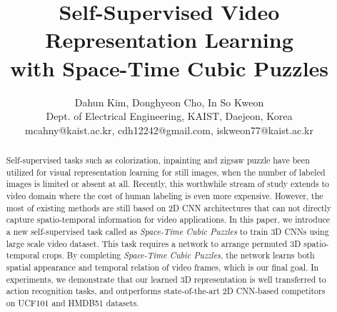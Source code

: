 \documentclass[letterpaper]{article} \usepackage{aaai19}  \usepackage{times}  \usepackage{helvet}  \usepackage{courier}  \usepackage{url}  \usepackage{graphicx}  \frenchspacing  \setlength{\pdfpagewidth}{8.5in}  \setlength{\pdfpageheight}{11in}
\begin{document}
\title{Self-Supervised Video Representation Learning \\with Space-Time Cubic Puzzles}
\author{Dahun Kim, Donghyeon Cho, In So Kweon\\
Dept. of Electrical Engineering, KAIST, Daejeon, Korea\\
mcahny@kaist.ac.kr, cdh12242@gmail.com, iskweon77@kaist.ac.kr
}

\maketitle

\begin{abstract}
Self-supervised tasks such as colorization, inpainting and zigsaw puzzle have been utilized for visual representation learning for still images, when the number of labeled images is limited or absent at all. Recently, this worthwhile stream of study extends to video domain where the cost of human labeling is even more expensive. However, the most of existing methods are still based on 2D CNN architectures that can not directly capture spatio-temporal information for video applications. In this paper, we introduce a new self-supervised task called as \textit{Space-Time Cubic Puzzles} to train 3D CNNs using large scale video dataset. This task requires a network to arrange permuted 3D spatio-temporal crops. By completing \textit{Space-Time Cubic Puzzles}, the network learns both spatial appearance and temporal relation of video frames, which is our final goal. In experiments, we demonstrate that our learned 3D representation is well transferred to action recognition tasks, and outperforms state-of-the-art 2D CNN-based competitors on UCF101 and HMDB51 datasets. 




\end{abstract}
 


 
\end{document}
